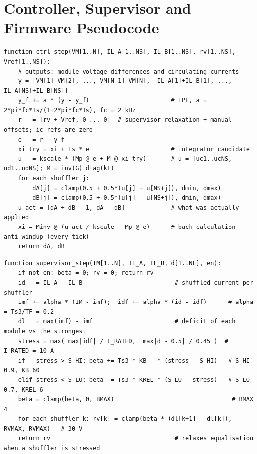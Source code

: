 \section{Controller, Supervisor and Firmware Pseudocode}
\label{app:pseudo}

\begin{lstlisting}[caption={MIMO decoupling PI, one 100\,$\mu$s tick (\code{shuffler\_ctrl.c}).},label={lst:ctrl}]
function ctrl_step(VM[1..N], IL_A[1..NS], IL_B[1..NS], rv[1..NS], Vref[1..NS]):
    # outputs: module-voltage differences and circulating currents
    y = [VM[1]-VM[2], ..., VM[N-1]-VM[N],  IL_A[1]+IL_B[1], ..., IL_A[NS]+IL_B[NS]]
    y_f += a * (y - y_f)                       # LPF, a = 2*pi*fc*Ts/(1+2*pi*fc*Ts), fc = 2 kHz
    r   = [rv + Vref, 0 ... 0]  # supervisor relaxation + manual offsets; ic refs are zero
    e   = r - y_f
    xi_try = xi + Ts * e                       # integrator candidate
    u   = kscale * (Mp @ e + M @ xi_try)       # u = [uc1..ucNS, ud1..udNS]; M = inv(G) diag(kI)
    for each shuffler j:
        dA[j] = clamp(0.5 + 0.5*(u[j] + u[NS+j]), dmin, dmax)
        dB[j] = clamp(0.5 + 0.5*(u[j] - u[NS+j]), dmin, dmax)
    u_act = [dA + dB - 1, dA - dB]             # what was actually applied
    xi = Minv @ (u_act / kscale - Mp @ e)      # back-calculation anti-windup (every tick)
    return dA, dB
\end{lstlisting}

\begin{lstlisting}[caption={Feasibility governor / supervisor, 1\,ms (\code{shuffler\_supervisor.c}).},label={lst:sup}]
function supervisor_step(IM[1..N], IL_A, IL_B, d[1..NL], en):
    if not en: beta = 0; rv = 0; return rv
    id   = IL_A - IL_B                          # shuffled current per shuffler
    imf += alpha * (IM - imf);  idf += alpha * (id - idf)      # alpha = Ts3/TF = 0.2
    dl   = max(imf) - imf                       # deficit of each module vs the strongest
    stress = max( max|idf| / I_RATED,  max|d - 0.5| / 0.45 )  # I_RATED = 10 A
    if   stress > S_HI: beta += Ts3 * KB   * (stress - S_HI)   # S_HI 0.9, KB 60
    elif stress < S_LO: beta -= Ts3 * KREL * (S_LO - stress)   # S_LO 0.7, KREL 6
    beta = clamp(beta, 0, BMAX)                                 # BMAX 4
    for each shuffler k: rv[k] = clamp(beta * (dl[k+1] - dl[k]), -RVMAX, RVMAX)   # 30 V
    return rv                                   # relaxes equalisation when a shuffler is stressed
\end{lstlisting}

